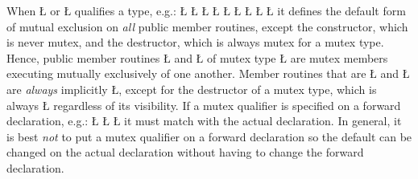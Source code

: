 \documentclass[openright,twoside]{report}
\begin{document}
When \LGinlinetrue\LGbegin\lgrinde\L{}\endlgrinde\LGend{} or \LGinlinetrue\LGbegin\lgrinde\L{}\endlgrinde\LGend{} qualifies a type, e.g.:
\LGinlinefalse\LGbegin\lgrinde
\L{}
\L{}
\L{\LB{}}
\CE{}\L{}
\L{\LB{}}
\CE{}\L{\LB{}}
\CE{}\L{\LB{}}
\CE{}\L{\LB{}}
\CE{}\L{\LB{\};}}
\endlgrinde\LGend
it defines the default form of mutual exclusion on \emph{all} public member routines, except the constructor, which is never mutex, and the destructor, which is always mutex for a mutex type.
Hence, public member routines \LGinlinetrue\LGbegin\lgrinde\L{}\endlgrinde\LGend{} and \LGinlinetrue\LGbegin\lgrinde\L{}\endlgrinde\LGend{} of mutex type \LGinlinetrue\LGbegin\lgrinde\L{}\endlgrinde\LGend{} are mutex members executing mutually exclusively of one another.
Member routines that are \LGinlinetrue\LGbegin\lgrinde\L{}\endlgrinde\LGend{} and \LGinlinetrue\LGbegin\lgrinde\L{}\endlgrinde\LGend{} are \emph{always} implicitly \LGinlinetrue\LGbegin\lgrinde\L{}\endlgrinde\LGend{}, except for the destructor of a mutex type, which is always \LGinlinetrue\LGbegin\lgrinde\L{}\endlgrinde\LGend{} regardless of its visibility.
If a mutex qualifier is specified on a forward declaration, e.g.:
\LGinlinefalse\LGbegin\lgrinde
\L{}
\CE{}\L{}
\L{}
\CE{}\endlgrinde\LGend
it must match with the actual declaration.
In general, it is best \emph{not} to put a mutex qualifier on a forward declaration so the default can be changed on the actual declaration without having to change the forward declaration.
\end{document}
